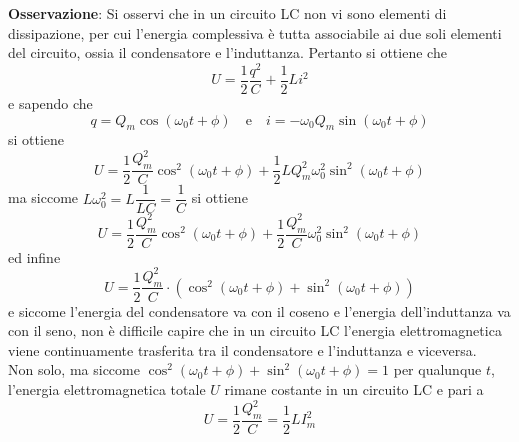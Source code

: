 \documentclass[a4paper]{extarticle}
\begin{document}
\vspace{2em}
\noindent
\textbf{Osservazione}: Si osservi che in un circuito LC non vi sono elementi di dissipazione, per cui l'energia complessiva è tutta associabile ai due soli elementi del circuito, ossia il condensatore e l'induttanza. Pertanto si ottiene che
\[U=\dfrac{1}{2} \dfrac{q^2}{C} + \dfrac{1}{2} Li^2\]
e sapendo che
\[q=Q_m \cos(\omega_0 t + \phi) \hspace{1em} \text{e} \hspace{1em} i=-\omega_0 Q_m \sin(\omega_0 t + \phi)\]
si ottiene
\[U=\dfrac{1}{2} \dfrac{Q_m^2}{C} \cos^2(\omega_0 t + \phi) + \dfrac{1}{2} L Q_m^2 \omega_0^2 \sin^2(\omega_0 t + \phi)\]
ma siccome $L \omega_0^2 = L \dfrac{1}{LC} = \dfrac{1}{C}$ si ottiene
\[U=\dfrac{1}{2} \dfrac{Q_m^2}{C} \cos^2(\omega_0 t + \phi) + \dfrac{1}{2} \dfrac{Q_m^2}{C} \omega_0^2 \sin^2(\omega_0 t + \phi)\]
ed infine
\[U=\dfrac{1}{2} \dfrac{Q_m^2}{C} \cdot \left(\cos^2(\omega_0 t + \phi) + \sin^2(\omega_0 t + \phi)\right)\]
e siccome l'energia del condensatore va con il coseno e l'energia dell'induttanza va con il seno, non è difficile capire che in un circuito LC l'energia elettromagnetica viene continuamente trasferita tra il condensatore e l'induttanza e viceversa.\\
Non solo, ma siccome $\cos^2(\omega_0 t + \phi) + \sin^2(\omega_0 t + \phi)=1$ per qualunque $t$, l'energia elettromagnetica totale $U$ rimane costante in un circuito LC e pari a
\[U=\dfrac{1}{2} \dfrac{Q_m^2}{C} = \dfrac{1}{2} L I_m^2\]

\vspace{1em}
\end{document}
